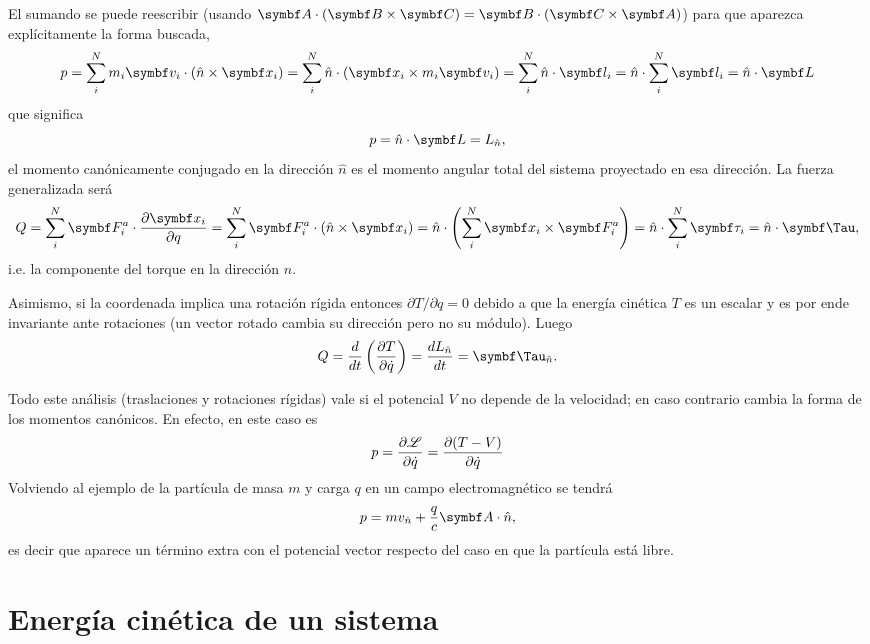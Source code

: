 \documentclass[10pt,oneside]{CBFT_book}
\begin{document}
El sumando se puede reescribir (usando $\vb{A}\cdot(\vb{B}\times\vb{C}) = 
\vb{B}\cdot(\vb{C}\times\vb{A})$) para que aparezca explícitamente la forma buscada,
\[
	p = \sum_i^N m_i \vb{v}_i \cdot ( \hat{n} \times \vb{x}_i ) =
	\sum_i^N \hat{n} \cdot ( \vb{x}_i \times m_i \vb{v}_i  ) =
	\sum_i^N \hat{n} \cdot \vb{l}_i = \hat{n} \cdot \sum_i^N \vb{l}_i =
	\hat{n} \cdot \vb{L}
\]
que significa
\[
	p = \hat{n} \cdot \vb{L} = L_{\hat{n}},
\]
el momento canónicamente conjugado en la dirección $\hat{n}$ es el momento angular total
del sistema proyectado en esa dirección.
La fuerza generalizada será
\[
	Q = \sum_i^N \vb{F}^a_i \cdot \dpar{\vb{x}_i}{q} = 
	\sum_i^N \vb{F}^a_i \cdot ( \hat{n} \times \vb{x}_i ) = 
	\hat{n} \cdot \left( \sum_i^N \vb{x}_i \times  \vb{F}^a_i \right) = 
	\hat{n} \cdot \sum_i^N \vb{\tau}_i = \hat{n} \cdot \vb{\Tau},
\]
i.e. la componente del torque en la dirección $ \hat{n} $.

Asimismo, si la coordenada implica una rotación rígida entonces $ \partial{T}/\partial{q} = 0 $ 
debido a que la energía cinética $ T $ es un escalar y es por ende invariante ante rotaciones
(un vector rotado cambia su dirección pero no su módulo).
Luego
\[
	Q = \frac{d}{dt}\left( \dpar{T}{\dot{q}} \right) = \dtot{L_{\hat{n}}}{t} = \vb{\Tau}_{\hat{n}}.
\]

Todo este análisis (traslaciones y rotaciones rígidas) vale si el potencial $V$ no depende de la
velocidad; en caso contrario cambia la forma de los momentos canónicos. En efecto, en este caso
es
\[
	p = \frac{\partial^{\hspace{-0.05em}} { \mathscr{L} }}{\partial {\dot{q}}^{\hspace{-0.05em}}} = \frac{\partial^{\hspace{-0.05em}} {(T-V)}}{\partial {\dot{q}}^{\hspace{-0.05em}}}
\]
Volviendo al ejemplo de la partícula de masa $m$ y carga $q$ en un campo electromagnético se tendrá
\[
	p = m v_{\hat{n}} + \frac{q}{c} \vb{A}\cdot\hat{n},
\]
es decir que aparece un término extra con el potencial vector respecto del caso en que la partícula
está libre.

\section{Energía cinética de un sistema}
\end{document}
